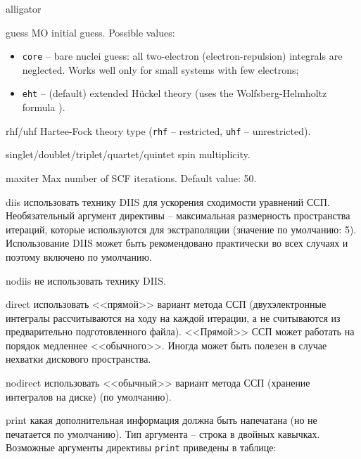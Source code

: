\documentclass[a4paper, 12pt]{article}
\begin{document}
\begin{labeling}{alligator}
\item [guess] MO initial guess. Possible values:
	\begin{itemize}
	\item \texttt{core} -- bare nuclei guess: all two-electron (electron-repulsion) integrals are neglected. Works well only for small systems with few electrons;
	\item \texttt{eht} -- (default) extended H\"uckel theory \cite{hoffmann1963} (uses the Wolfsberg-Helmholtz formula \cite{wolfsberg1952}).
	\end{itemize}
\item [rhf/uhf] Hartee-Fock theory type (\texttt{rhf} -- restricted, \texttt{uhf} -- unrestricted).
\item [singlet/doublet/triplet/quartet/quintet] spin multiplicity.
\item [maxiter] Max number of SCF iterations. Default value: 50.
\item [diis] использовать технику DIIS \cite{pulay1980,pulay1981} для ускорения сходимости уравнений ССП. Необязательный аргумент директивы -- максимальная размерность пространства итераций, которые используются для экстраполяции (значение по умолчанию: 5). Использование DIIS может быть рекомендовано практически во всех случаях и поэтому включено по умолчанию.
\item [nodiis] не использовать технику DIIS.
\item [direct] использовать <<прямой>> вариант метода ССП (двухэлектронные интегралы рассчитываются на ходу на каждой итерации, а не считываются из предварительно подготовленного файла). <<Прямой>> ССП может работать на порядок медленнее <<обычного>>. Иногда может быть полезен в случае нехватки дискового пространства.
\item [nodirect] использовать <<обычный>> вариант метода ССП (хранение интегралов на диске) (по умолчанию).
\item [print] какая дополнительная информация должна быть напечатана (но не печатается по умолчанию). Тип аргумента -- строка в двойных кавычках. Возможные аргументы директивы \texttt{print} приведены в таблице:


\end{labeling}
\end{document}
